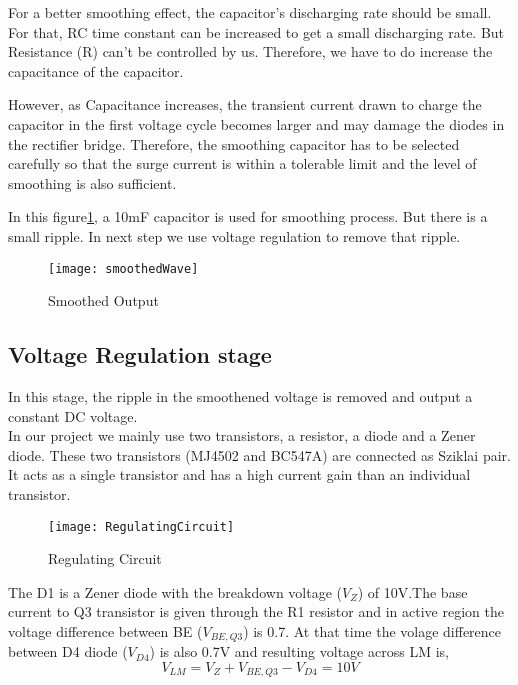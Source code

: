 \documentclass[11pt,a4paper]{article}
\begin{document}
\begin{multicols}{2}
For a better smoothing effect, the capacitor’s discharging rate should be small. For that, RC time constant can be increased to get a small discharging rate. But Resistance (R) can’t be controlled by us. Therefore, we have to do increase the capacitance of the capacitor. 

However, as Capacitance increases, the transient current drawn to charge the capacitor in the first voltage cycle becomes larger and may damage the diodes in the rectifier bridge. Therefore, the smoothing capacitor has to be selected carefully so that the surge current is within a tolerable limit and the level of smoothing is also sufficient.

In this figure\ref{fig:Smoothing}, a 10mF capacitor is used for smoothing process. But there is a small ripple. In next step we use voltage regulation to remove that ripple.


\begin{figure}[H]
    \centering
    \texttt{[image: smoothedWave]}
    \caption{Smoothed Output}
    \label{fig:Smoothing}
\end{figure}

\vspace{0.5in}
\subsection{Voltage Regulation stage}
In this stage, the ripple in the smoothened voltage is removed and output a constant DC voltage. \\

In our project we mainly use two transistors, a resistor, a diode and a Zener diode. These two transistors (MJ4502 and BC547A) are connected as Sziklai pair. It acts as a single transistor and has a high current gain than an individual transistor. 

\begin{wrapfigure}{l}{0.3\textwidth} 
    \centering
    \texttt{[image: RegulatingCircuit]}
    \caption{Regulating Circuit}
    \label{fig:RegulatingCircuit}
\end{wrapfigure}

\vspace{0.1in}
The D1 is a Zener diode with the breakdown voltage ($V_Z$) of 10V.The base current to Q3 transistor is given through the R1 resistor and in active region the voltage difference between BE ($V_{BE,Q3}$) is 0.7. At that time the volage difference between D4 diode ($V_{D4}$) is also 0.7V and resulting voltage across LM is,
\begin{equation}
    V_{LM} = V_Z + V_{BE,Q3} -V_{D4} =10V
\end{equation}


\end{multicols}
\end{document}
